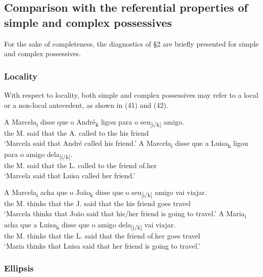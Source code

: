 \documentclass[output=paper]{langsci/langscibook}
\begin{document}
\subsection{Comparison with the referential properties of simple and complex possessives}%

For the sake of completeness, the diagnostics of §2 are briefly presented for simple and complex possessives.

\subsubsection{Locality}%

With respect to locality, both simple and complex possessives may refer to a local or a non-local antecedent, as shown in (41) and (42).

\ea%
    \label{ex:wein:41}
    \ea
    \gll A Marcela\textsubscript{i} disse que o André\textsubscript{k} ligou para o seu\textsubscript{[i/k]} amigo.\\
         the M. said that the A. called to the his friend\\
    \glt ‘Marcela said that André called his friend.’
    \ex  
    \gll A Marcela\textsubscript{i} disse que a Luisa\textsubscript{k} ligou para o amigo dela\textsubscript{[i/k]}.\\
         the M. said that the L. called to the friend of.her\\
    \glt ‘Marcela said that Luisa called her friend.’
    \z
\z



\ea%
    \label{ex:wein:42}
    \ea
    \gll A Marcela\textsubscript{i} acha que o João\textsubscript{k} disse que o seu\textsubscript{[i/k]} amigo vai viajar.\\
         the M. thinks that the J. said that the his friend goes travel\\
    \glt ‘Marcela thinks that João said that his/her friend is going to travel.’
    \ex  
    \gll A Maria\textsubscript{i} acha que a Luisa\textsubscript{k} disse que o amigo dela\textsubscript{[i/k]} vai viajar.\\
         the M. thinks that the L. said that the friend of.her goes travel\\
    \glt ‘Maria thinks that Luisa said that her friend is going to travel.’
    \z
\z

\subsubsection{Ellipsis}%
\end{document}
